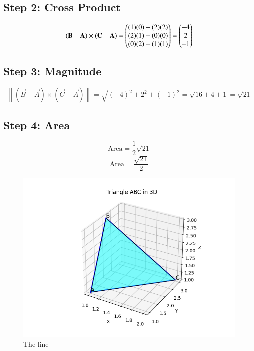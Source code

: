 \documentclass[journal]{IEEEtran}
\begin{document}
\subsection*{Step 2: Cross Product}
\[
(\mathbf{B} - \mathbf{A}) \times (\mathbf{C} - \mathbf{A}) =
\begin{pmatrix}
(1)(0) - (2)(2) \\
(2)(1) - (0)(0) \\
(0)(2) - (1)(1)
\end{pmatrix} =
\begin{pmatrix}-4 \\ 2 \\ -1\end{pmatrix}
\]

\subsection*{Step 3: Magnitude}
\[
\left\| (\vec{B} - \vec{A}) \times (\vec{C} - \vec{A}) \right\| =
\sqrt{(-4)^2 + 2^2 + (-1)^2} =
\sqrt{16 + 4 + 1} = \sqrt{21}
\]

\subsection*{Step 4: Area}
\[
\text{Area} = \frac{1}{2} \sqrt{21}
\]
\[
\boxed{\text{Area} = \frac{\sqrt{21}}{2}}
\]





\begin{figure}[h!t]
    \centering
    \includegraphics[width=1\linewidth]{Figs/fig1.png}
    \caption{The line}
    \label{fig:fig1}
\end{figure}
\end{document}
